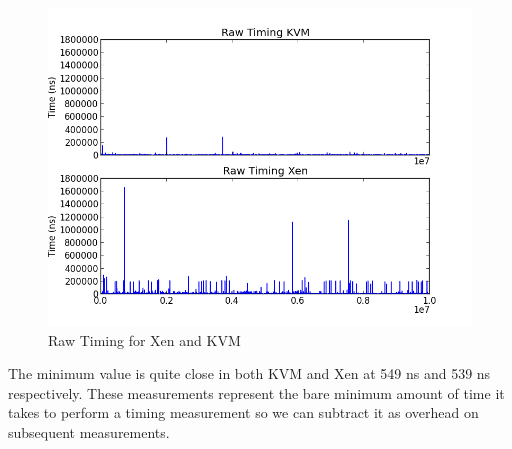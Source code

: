 \begin{figure}\label{RawTiming}
	  \centering
	  \includegraphics[width=\textwidth]{figures/RawTimingXenandKVM.png}
	  \caption{Raw Timing for Xen and KVM}
\end{figure}


The minimum value is quite close in both KVM and Xen at 549 ns and 539 ns respectively. These measurements represent the bare minimum amount of time it takes to perform a timing measurement so we can subtract it as overhead on subsequent measurements.  